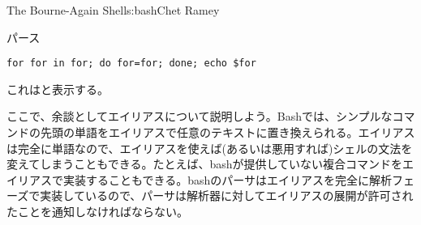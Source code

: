 \begin{aosachapter}{The Bourne-Again Shell}{s:bash}{Chet Ramey}
\begin{aosasect1}{パース}
\begin{verbatim}
for for in for; do for=for; done; echo $for
\end{verbatim}

\noindent これはと表示する。

ここで、余談としてエイリアスについて説明しよう。Bashでは、シンプルなコマンドの先頭の単語をエイリアスで任意のテキストに置き換えられる。エイリアスは完全に単語なので、エイリアスを使えば(あるいは悪用すれば)シェルの文法を変えてしまうこともできる。たとえば、bashが提供していない複合コマンドをエイリアスで実装することもできる。bashのパーサはエイリアスを完全に解析フェーズで実装しているので、パーサは解析器に対してエイリアスの展開が許可されたことを通知しなければならない。


\end{aosasect1}
\end{aosachapter}
